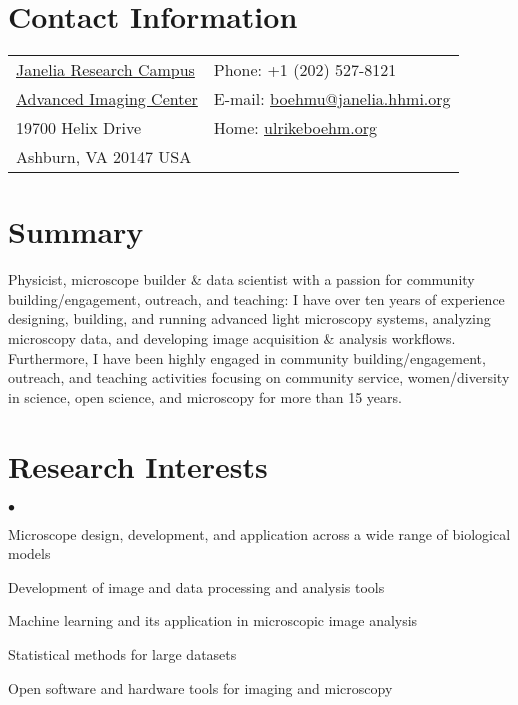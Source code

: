 \documentclass[margin,line]{res}
\newenvironment{list2}{
  \begin{list}{$\bullet$}{%
      \setlength{\itemsep}{0in}
      \setlength{\parsep}{0in} \setlength{\parskip}{0in}
      \setlength{\topsep}{0in} \setlength{\partopsep}{0in} 
      \setlength{\leftmargin}{0.2in}}}{\end{list}}
\begin{document}


\begin{resume}


\section{\sc Contact Information}
\vspace{.05in}
\begin{tabular}{@{}p{3.5in}p{4in}}
 \href{https://www.janelia.org/}{Janelia Research Campus}     & {Phone:} +1 (202) 527-8121 \\            
 \href{https://www.aicjanelia.org/}{Advanced Imaging Center}   & { E-mail:}   \href{mailto:boehmu@janelia.hhmi.org}{boehmu@janelia.hhmi.org}  \\         
19700 Helix Drive & { Home:}  \href{http://ulrikeboehm.org/}{ulrikeboehm.org}\\       
Ashburn, VA  20147 USA  &  \\     
\end{tabular}


\section{\sc Summary}
Physicist, microscope builder \& data scientist with a passion for community building/engagement, outreach, and teaching: I have over ten years of experience designing, building, and running advanced light microscopy systems, analyzing microscopy data, and developing image acquisition \& analysis workflows. Furthermore, I have been highly engaged in community building/engagement, outreach, and teaching activities focusing on community service, women/diversity in science, open science, and microscopy for more than 15 years.


\section{\sc Research Interests}
\begin{list2}
\item Microscope design, development, and application across a wide range of biological models %
\item Development of image and data processing and analysis tools
\item Machine learning and its application in microscopic image analysis
\item Statistical methods for large datasets
\item Open software and hardware tools for imaging and microscopy
\end{list2}


\end{resume}
\end{document}
